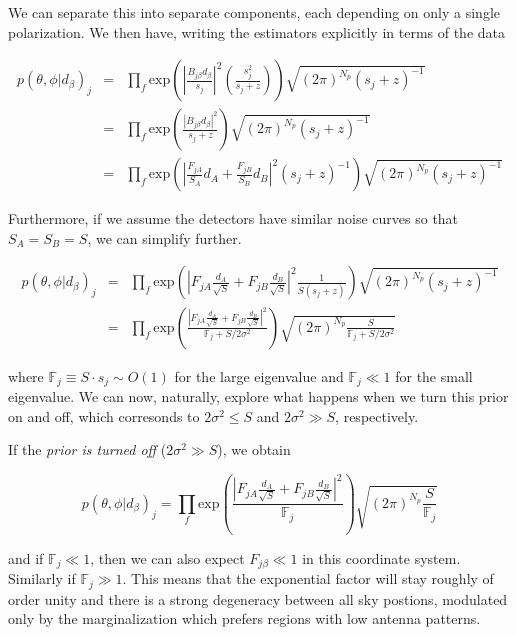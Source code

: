 \documentclass[10pt]{article}
\begin{document}
We can separate this into separate components, each depending on only a single polarization. We then have, writing the estimators explicitly in terms of the data

\begin{eqnarray}
p(\theta,\phi|d_\beta)_j & = & \prod\limits_f \mathrm{exp}\left( \left|\frac{B_{j\beta}d_\beta}{s_j}\right|^2 \left( \frac{s_j^2}{s_j+z} \right) \right) \sqrt{(2\pi)^{N_p} (s_j+z)^{-1}} \\
                         & = & \prod\limits_f \mathrm{exp}\left( \frac{\left|B_{j\beta}d_\beta\right|^2}{s_j+z} \right) \sqrt{(2\pi)^{N_p} (s_j+z)^{-1}} \\
                         & = & \prod\limits_f \mathrm{exp}\left( \left|\frac{F_{jA}}{S_A} d_A + \frac{F_{jB}}{S_B} d_B\right|^2\left(s_j+z\right)^{-1} \right) \sqrt{(2\pi)^{N_p} (s_j+z)^{-1}}
\end{eqnarray}

Furthermore, if we assume the detectors have similar noise curves so that $S_A = S_B = S$, we can simplify further.

\begin{eqnarray}
p(\theta,\phi|d_\beta)_j & = & \prod\limits_f \mathrm{exp}\left( \left|F_{jA} \frac{d_A}{\sqrt{S}} + F_{jB} \frac{d_B}{\sqrt{S}}\right|^2 \frac{1}{S\left(s_j+z\right)} \right) \sqrt{(2\pi)^{N_p} (s_j+z)^{-1}} \\
                         & = & \prod\limits_f \mathrm{exp}\left( \frac{\left|F_{jA} \frac{d_A}{\sqrt{S}} + F_{jB} \frac{d_B}{\sqrt{S}}\right|^2}{\mathbb{F}_j+S/2\sigma^2} \right) \sqrt{(2\pi)^{N_p} \frac{S}{\mathbb{F}_j+S/2\sigma^2}}
\end{eqnarray}

where $\mathbb{F}_j \equiv S\cdot s_j \sim O(1)$ for the large eigenvalue and $\mathbb{F}_j \ll 1$ for the small eigenvalue. We can now, naturally, explore what happens when we turn this prior on and off, which corresonds to $2\sigma^2 \leq S$ and $2\sigma^2 \gg S$, respectively.

If the \emph{prior is turned off} ($2\sigma^2 \gg S$), we obtain

\begin{equation}
p(\theta,\phi|d_\beta)_j = \prod\limits_f \mathrm{exp}\left( \frac{\left|F_{jA} \frac{d_A}{\sqrt{S}} + F_{jB} \frac{d_B}{\sqrt{S}}\right|^2}{\mathbb{F}_j} \right) \sqrt{(2\pi)^{N_p} \frac{S}{\mathbb{F}_j}}
\end{equation}

and if $\mathbb{F}_j \ll 1$, then we can also expect $F_{j\beta}\ll 1$ in this coordinate system. Similarly if $\mathbb{F}_j\gg 1$. This means that the exponential factor will stay roughly of order unity and there is a strong degeneracy between all sky postions, modulated only by the marginalization which prefers regions with low antenna patterns.
\end{document}

